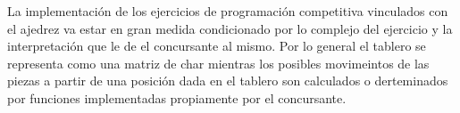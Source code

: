 La implementación de los ejercicios de programación competitiva vinculados con el ajedrez va estar en gran medida condicionado por lo complejo del ejercicio y la interpretación que le de el concursante al mismo. Por lo general el tablero se representa como una matriz de char mientras los posibles movimeintos de las piezas a partir de una posición dada en el tablero son calculados o derteminados por funciones implementadas propiamente por el concursante. 